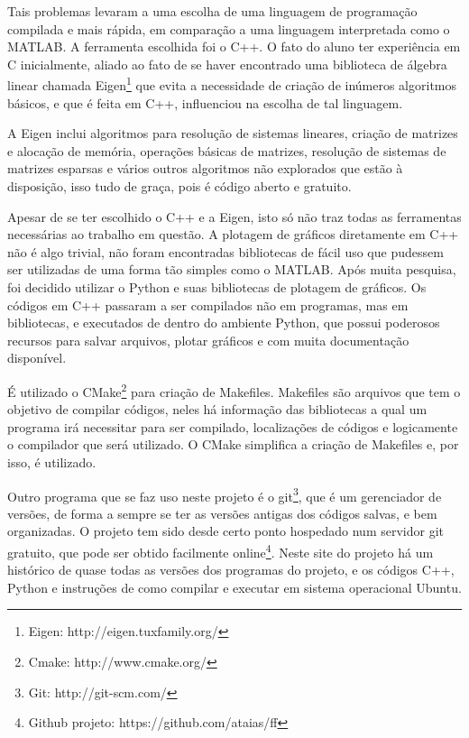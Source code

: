 \documentclass[journal]{IEEEtran}
\begin{document}
Tais problemas levaram a uma escolha de uma linguagem de programação compilada e mais rápida, em comparação a uma linguagem interpretada como o MATLAB. A ferramenta escolhida foi o C++. O fato do aluno ter experiência em C inicialmente, aliado ao fato de se haver encontrado uma biblioteca de álgebra linear chamada Eigen\footnote{Eigen: http://eigen.tuxfamily.org/} que evita a necessidade de criação de inúmeros algoritmos básicos, e que é feita em C++, influenciou na escolha de tal linguagem.

A Eigen inclui algoritmos para resolução de sistemas lineares, criação de matrizes e alocação de memória, operações básicas de matrizes, resolução de sistemas de matrizes esparsas e vários outros algoritmos não explorados que estão à disposição, isso tudo de graça, pois é código aberto e gratuito. 

Apesar de se ter escolhido o C++ e a Eigen, isto só não traz todas as ferramentas necessárias ao trabalho em questão. A plotagem de gráficos diretamente em C++ não é algo trivial, não foram encontradas bibliotecas de fácil uso que pudessem ser utilizadas de uma forma tão simples como o MATLAB. Após muita pesquisa, foi decidido utilizar o Python e suas bibliotecas de plotagem de gráficos. Os códigos em C++ passaram a ser compilados não em programas, mas em bibliotecas, e executados de dentro do ambiente Python, que possui poderosos recursos para salvar arquivos, plotar gráficos e com muita documentação disponível.

É utilizado o CMake\footnote{Cmake: http://www.cmake.org/} para criação de Makefiles. Makefiles são arquivos que tem o objetivo de compilar códigos, neles há informação das bibliotecas a qual um programa irá necessitar para ser compilado, localizações de códigos e logicamente o compilador que será utilizado. O CMake simplifica a criação de Makefiles e, por isso, é utilizado. 

Outro programa que se faz uso neste projeto é o git\footnote{Git: http://git-scm.com/}, que é um gerenciador de versões, de forma a sempre se ter as versões antigas dos códigos salvas, e bem organizadas. O projeto tem sido desde certo ponto hospedado num servidor git gratuito, que pode ser obtido facilmente online\footnote{Github projeto: https://github.com/ataias/ff}. Neste site do projeto há um histórico de quase todas as versões dos programas do projeto, e os códigos C++, Python e instruções de como compilar e executar em sistema operacional Ubuntu.
\end{document}
